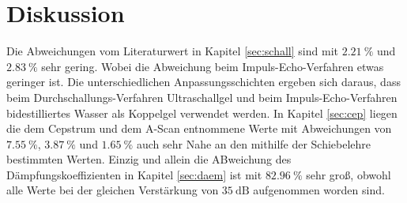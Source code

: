 \section{Diskussion}

Die Abweichungen vom Literaturwert in Kapitel \ref{sec:schall} sind mit $\SI{2,21}{\%}$ und $\SI{2,83}{\%}$ sehr gering. Wobei die Abweichung
beim Impuls-Echo-Verfahren etwas geringer ist.
Die unterschiedlichen Anpassungsschichten ergeben sich daraus, dass beim Durchschallungs-Verfahren Ultraschallgel und beim
Impuls-Echo-Verfahren bidestilliertes Wasser als Koppelgel verwendet werden.
In Kapitel \ref{sec:cep} liegen die dem Cepstrum und dem A-Scan entnommene Werte mit Abweichungen von $\SI{7,55}{\%}$, $\SI{3,87}{\%}$
und $\SI{1,65}{\%}$ auch sehr Nahe an den mithilfe der Schiebelehre bestimmten Werten.
Einzig und allein die ABweichung des Dämpfungskoeffizienten in Kapitel \ref{sec:daem} ist mit $\SI{82,96}{\%}$ sehr groß, obwohl alle Werte bei
der gleichen Verstärkung von $\SI{35}{\dB}$ aufgenommen worden sind.
